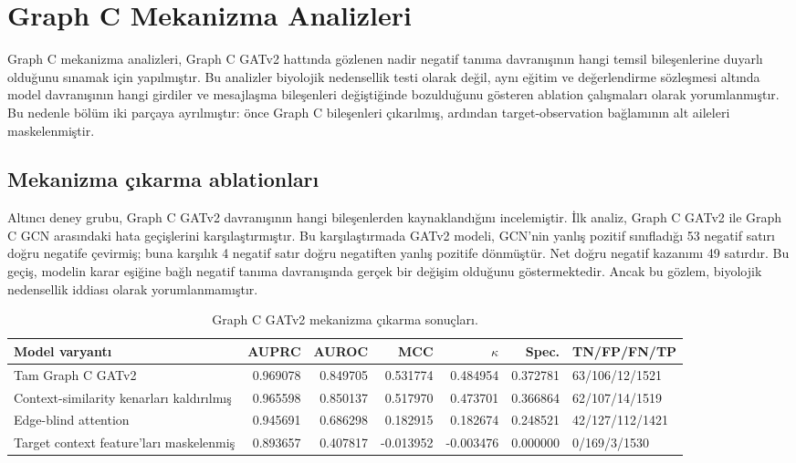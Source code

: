\section{Graph C Mekanizma Analizleri}

Graph C mekanizma analizleri, Graph C GATv2 hattında gözlenen nadir negatif tanıma davranışının hangi temsil bileşenlerine duyarlı olduğunu sınamak için yapılmıştır. Bu analizler biyolojik nedensellik testi olarak değil, aynı eğitim ve değerlendirme sözleşmesi altında model davranışının hangi girdiler ve mesajlaşma bileşenleri değiştiğinde bozulduğunu gösteren ablation çalışmaları olarak yorumlanmıştır. Bu nedenle bölüm iki parçaya ayrılmıştır: önce Graph C bileşenleri çıkarılmış, ardından target-observation bağlamının alt aileleri maskelenmiştir.

\subsection{Mekanizma çıkarma ablationları}

Altıncı deney grubu, Graph C GATv2 davranışının hangi bileşenlerden kaynaklandığını incelemiştir. İlk analiz, Graph C GATv2 ile Graph C GCN arasındaki hata geçişlerini karşılaştırmıştır. Bu karşılaştırmada GATv2 modeli, GCN'nin yanlış pozitif sınıfladığı 53 negatif satırı doğru negatife çevirmiş; buna karşılık 4 negatif satır doğru negatiften yanlış pozitife dönmüştür. Net doğru negatif kazanımı 49 satırdır. Bu geçiş, modelin karar eşiğine bağlı negatif tanıma davranışında gerçek bir değişim olduğunu göstermektedir. Ancak bu gözlem, biyolojik nedensellik iddiası olarak yorumlanmamıştır.

\begin{table}[htbp]
\caption{Graph C GATv2 mekanizma çıkarma sonuçları.}
\label{tab:graphc-mekanizma}
\centering
\scriptsize
\begin{tabularx}{\textwidth}{>{\raggedright\arraybackslash}X r r r r r l}
\toprule\toprule
Model varyantı & AUPRC & AUROC & MCC & $\kappa$ & Spec. & TN/FP/FN/TP\\
\midrule
Tam Graph C GATv2 & 0.969078 & 0.849705 & 0.531774 & 0.484954 & 0.372781 & 63/106/12/1521\\
Context-similarity kenarları kaldırılmış & 0.965598 & 0.850137 & 0.517970 & 0.473701 & 0.366864 & 62/107/14/1519\\
Edge-blind attention & 0.945691 & 0.686298 & 0.182915 & 0.182674 & 0.248521 & 42/127/112/1421\\
Target context feature'ları maskelenmiş & 0.893657 & 0.407817 & -0.013952 & -0.003476 & 0.000000 & 0/169/3/1530\\
\bottomrule
\end{tabularx}
\end{table}


